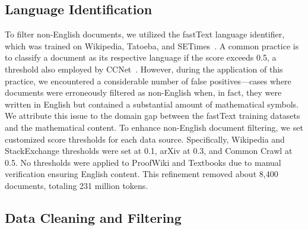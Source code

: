 \subsection{Language Identification}

To filter non-English documents, we utilized the fastText language identifier, which was trained on Wikipedia, Tatoeba, and SETimes~\citep{joulin-etal-2017-fasttext,grave-etal-2018-learning-vector-157-languages}. A common practice is to classify a document as its respective language if the score exceeds 0.5, a threshold also employed by CCNet~\citep{wenzek-etal-2020-ccnet}. However, during the application of this practice, we encountered a considerable number of false positives—cases where documents were erroneously filtered as non-English when, in fact, they were written in English but contained a substantial amount of mathematical symbols. We attribute this issue to the domain gap between the fastText training datasets and the mathematical content. To enhance non-English document filtering, we set customized score thresholds for each data source. Specifically, Wikipedia and StackExchange thresholds were set at 0.1, arXiv at 0.3, and Common Crawl at 0.5. No thresholds were applied to ProofWiki and Textbooks due to manual verification ensuring English content. This refinement removed about 8,400 documents, totaling 231 million tokens.

\subsection{Data Cleaning and Filtering}


